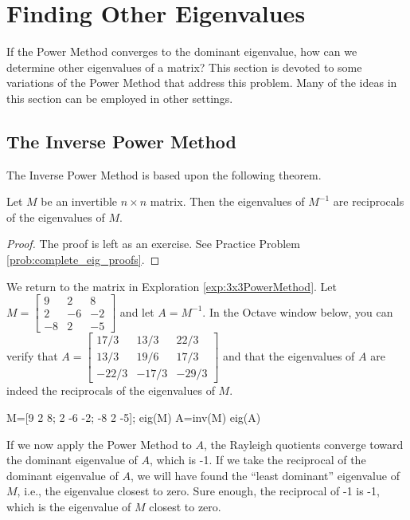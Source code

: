 \documentclass{ximera}
\begin{document}
\section*{Finding Other Eigenvalues}

If the Power Method converges to the dominant eigenvalue, how can we determine other eigenvalues of a matrix?  This section is devoted to some variations of the Power Method that address this problem.  Many of the ideas in this section can be employed in other settings.

\subsection*{The Inverse Power Method}

The Inverse Power Method is based upon the following theorem.

\begin{theorem}\label{th:eig_inverse}
Let $M$ be an invertible $n \times n$ matrix.  Then the eigenvalues of $M^{-1}$ are reciprocals of the eigenvalues of $M$.
\end{theorem}

\begin{proof}
The proof is left as an exercise.  See Practice Problem \ref{prob:complete_eig_proofs}.
\end{proof}

We return to the matrix in Exploration \ref{exp:3x3PowerMethod}.  Let $M=\left[ \begin{array}{rrr}
9 & 2 & 8 \\
2 & -6 & -2 \\
-8 & 2 & -5
\end{array}\right]$ and let $A=M^{-1}$.  In the Octave window below, you can verify that $A=\left[ \begin{array}{rrr}
17/3 & 13/3 & 22/3 \\
13/3 & 19/6 & 17/3 \\
-22/3 & -17/3 & -29/3
\end{array}\right]$ and that the eigenvalues of $A$ are indeed the reciprocals of the eigenvalues of $M$.

M=[9 2 8; 2 -6 -2; -8 2 -5];
eig(M)
A=inv(M)
eig(A)

If we now apply the Power Method to $A$, the Rayleigh quotients converge toward the dominant eigenvalue of $A$, which is -1.  If we take the reciprocal of the dominant eigenvalue of $A$, we will have found the ``least dominant'' eigenvalue of $M$, i.e., the eigenvalue closest to zero.  Sure enough, the reciprocal of -1 is -1, which is the eigenvalue of $M$ closest to zero.
\end{document}
